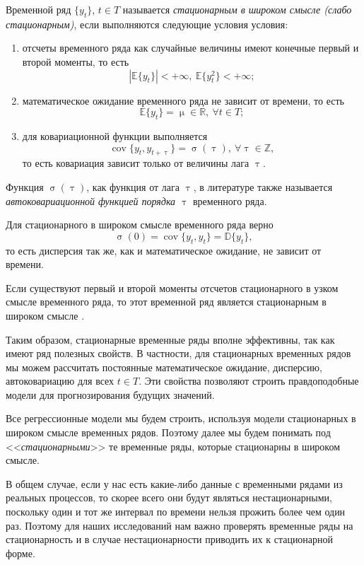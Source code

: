 \documentclass[a4paper, 14pt]{extreport}
\numberwithin{equation}{section}
\newcommand{\Rm}{\mathbb{R}}
\newcommand{\Z}{\mathbb{Z}}
\renewcommand{\mu}{\upmu}
\renewcommand{\sigma}{\upsigma}
\renewcommand{\tau}{\uptau}
\newcommand{\cov}{\operatorname{cov}}
\numberwithin{equation}{section}
\begin{document}
	Временной ряд $\{y_t\}$, $t \in T$ называется \textit{стационарным в широком смысле (слабо стационарным)}, если выполняются следующие условия условия:\begin{enumerate}
			\item отсчеты временного ряда как случайные величины имеют конечные первый и второй моменты, то есть $$|\mathbb E \{y_t\}|<+\infty,\ \mathbb E \{y_t^2\}<+\infty;$$
			\item математическое ожидание временного ряда не зависит от времени, то есть $$\mathbb E \{y_t\} = \mu \in \Rm,\ \forall t \in T;$$
			\item для ковариационной функции выполняется $$\cov\{y_{t},y_{t+\tau}\} = \sigma(\tau),\ \forall \tau \in \Z,$$
			то есть ковариация зависит только от величины лага $\tau$.
	\end{enumerate}
	
	Функция $\sigma(\tau)$, как функция от лага $\tau$, в литературе также называется \textit{автоковариационной функцией порядка $\tau$} временного ряда.
	
	Для стационарного в широком смысле временного ряда верно
	$$\sigma(0) = \cov\{y_t,y_t\}=\mathbb D\{y_t\},$$
	то есть дисперсия так же, как и математическое ожидание, не зависит от времени.
	
	Если существуют первый и второй моменты отсчетов стационарного в узком смысле временного ряда, то этот временной ряд является стационарным в широком смысле \cite{1}.
	
	Таким образом, стационарные временные ряды вполне эффективны, так как имеют ряд полезных свойств. В частности, для стационарных временных рядов мы можем рассчитать постоянные математическое ожидание, дисперсию, автоковариацию для всех $t\in T$. Эти свойства позволяют строить правдоподобные модели для прогнозирования будущих значений.
	
	Все регрессионные модели мы будем строить, используя модели стационарных в широком смысле временных рядов. Поэтому далее мы будем понимать под <<\textit{стационарными}>> те временные ряды, которые стационарны в широком смысле.
	
	В общем случае, если у нас есть какие-либо данные с временными рядами из реальных процессов, то скорее всего они будут являться нестационарными, поскольку один и тот же интервал по времени нельзя прожить более чем один раз. Поэтому для наших исследований нам важно проверять временные ряды на стационарность и в случае нестационарности приводить их к стационарной форме.
	
\end{document}
